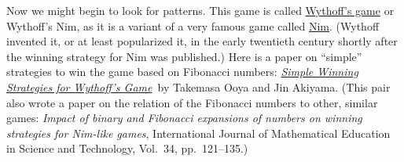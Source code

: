 \documentclass[12pt,letterpaper]{article}
\begin{document}
\begin{enumerate}
  Now we might begin to look for patterns. This game is called
  \href{https://en.wikipedia.org/wiki/Wythoff\%27s_game}{Wythoff's
    game} or Wythoff's Nim, as it is a variant of a very famous game
  called \href{https://en.wikipedia.org/wiki/Nim}{Nim}.  (Wythoff
  invented it, or at least popularized it, in the early twentieth
  century shortly after the winning strategy for Nim was published.)
  Here is a paper on ``simple'' strategies to win the game based on
  Fibonacci numbers:
  \href{http://ci.nii.ac.jp.ezp-prod1.hul.harvard.edu/openurl/query?rfe_dat=ncid\%2FAN10437727&rft.spage=53&rft.volume=9&rft.date=2002}{\emph{Simple
      Winning Strategies for Wythoff's Game}}\ by Takemasa Ooya and
  Jin Akiyama.  (This pair also wrote a paper on the relation of the
  Fibonacci numbers to other, similar games: \emph{Impact of binary
    and {F}ibonacci expansions of numbers on winning strategies for
    {N}im-like games}, International Journal of Mathematical Education
  in Science and Technology, Vol.\ 34, pp.\ 121--135.)



\end{enumerate}
\end{document}
